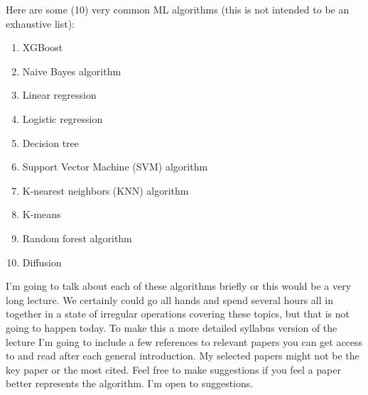 \documentclass{article}
\begin{document}
Here are some (10) very common ML algorithms (this is not intended to be an exhaustive list):

\begin{enumerate}
\item XGBoost
\item Naive Bayes algorithm
\item Linear regression
\item Logistic regression
\item Decision tree
\item Support Vector Machine (SVM) algorithm
\item K-nearest neighbors (KNN) algorithm
\item K-means
\item Random forest algorithm
\item Diffusion
\end{enumerate}

I’m going to talk about each of these algorithms briefly or this would be a very long lecture. We certainly could go all hands and spend several hours all in together in a state of irregular operations covering these topics, but that is not going to happen today. To make this a more detailed syllabus version of the lecture I’m going to include a few references to relevant papers you can get access to and read after each general introduction. My selected papers might not be the key paper or the most cited. Feel free to make suggestions if you feel a paper better represents the algorithm. I’m open to suggestions. 
\end{document}
